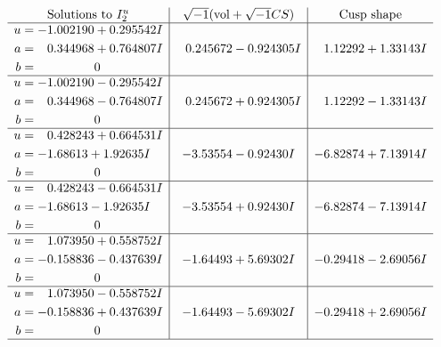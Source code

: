 \documentclass[1p]{elsarticle_modified}
\theoremstyle{definition}
\newcommand{\I}{\sqrt{-1}}
\begin{document}
$$\begin{array}{c|c|c}  
\text{Solutions to }I^u_{2}& \I (\text{vol} + \sqrt{-1}CS) & \text{Cusp shape}\\
 \hline 
\begin{aligned}
u &= -1.002190 + 0.295542 I \\
a &= \phantom{-}0.344968 + 0.764807 I \\
b &= \phantom{-0.000000 } 0\end{aligned}
 & \phantom{-}0.245672 - 0.924305 I & \phantom{-}1.12292 + 1.33143 I \\ \hline\begin{aligned}
u &= -1.002190 - 0.295542 I \\
a &= \phantom{-}0.344968 - 0.764807 I \\
b &= \phantom{-0.000000 } 0\end{aligned}
 & \phantom{-}0.245672 + 0.924305 I & \phantom{-}1.12292 - 1.33143 I \\ \hline\begin{aligned}
u &= \phantom{-}0.428243 + 0.664531 I \\
a &= -1.68613 + 1.92635 I \\
b &= \phantom{-0.000000 } 0\end{aligned}
 & -3.53554 - 0.92430 I & -6.82874 + 7.13914 I \\ \hline\begin{aligned}
u &= \phantom{-}0.428243 - 0.664531 I \\
a &= -1.68613 - 1.92635 I \\
b &= \phantom{-0.000000 } 0\end{aligned}
 & -3.53554 + 0.92430 I & -6.82874 - 7.13914 I \\ \hline\begin{aligned}
u &= \phantom{-}1.073950 + 0.558752 I \\
a &= -0.158836 - 0.437639 I \\
b &= \phantom{-0.000000 } 0\end{aligned}
 & -1.64493 + 5.69302 I & -0.29418 - 2.69056 I \\ \hline\begin{aligned}
u &= \phantom{-}1.073950 - 0.558752 I \\
a &= -0.158836 + 0.437639 I \\
b &= \phantom{-0.000000 } 0\end{aligned}
 & -1.64493 - 5.69302 I & -0.29418 + 2.69056 I\\
 \hline 
 \end{array}$$\newpage
\end{document}
